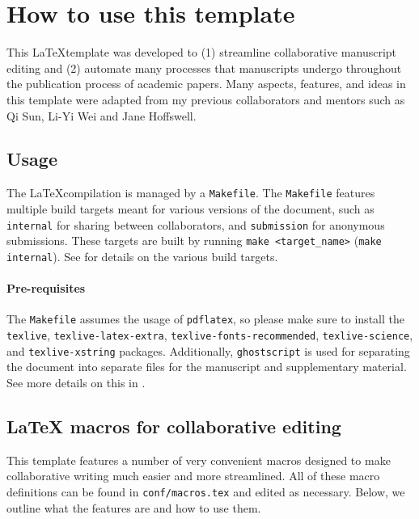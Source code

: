 
\section{How to use this template}

This \LaTeX template was developed to (1) streamline collaborative manuscript editing and (2) automate many processes that manuscripts undergo throughout the publication process of academic papers.
Many aspects, features, and ideas in this template were adapted from my previous collaborators and mentors such as Qi Sun, Li-Yi Wei and Jane Hoffswell.

\subsection{Usage}

The \LaTeX compilation is managed by a \texttt{Makefile}.
The \texttt{Makefile} features multiple build targets meant for various versions of the document, such as \texttt{internal} for sharing between collaborators, and \texttt{submission} for anonymous submissions.
These targets are built by running \texttt{make <target\_name>} (\eg \texttt{make internal}).
See  for details on the various build targets.

\paragraph{Pre-requisites}
The \texttt{Makefile} assumes the usage of \texttt{pdflatex}, so please make sure to install the \texttt{texlive}, \texttt{texlive-latex-extra}, \texttt{texlive-fonts-recommended}, \texttt{texlive-science}, and \texttt{texlive-x\hfill\break string} packages.
Additionally, \texttt{ghostscript} is used for separating the document into separate files for the manuscript and supplementary material.
See more details on this in .

\subsection{\LaTeX\xspace macros for collaborative editing}
\label{sec:howto:macros}

This template features a number of very convenient macros designed to make collaborative writing much easier and more streamlined.
All of these macro definitions can be found in \texttt{conf/macros.tex} and edited as necessary.
Below, we outline what the features are and how to use them.

